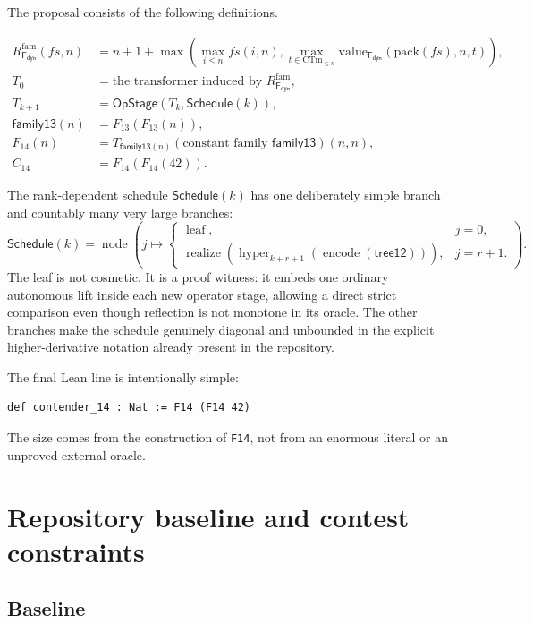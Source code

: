 \documentclass[11pt]{article}
\theoremstyle{definition}
\theoremstyle{remark}
\newcommand{\lean}[1]{\texttt{#1}}
\newcommand{\Fd}{\mathsf{F}_{\mathsf{dyn}}}
\newcommand{\opstage}{\mathsf{OpStage}}
\newcommand{\sched}{\mathsf{Schedule}}
\newcommand{\C}[1]{C_{#1}}
\newcommand{\Rfam}{R_{\Fd}^{\mathrm{fam}}}
\begin{document}
The proposal consists of the following definitions.

\begin{align*}
\Rfam(fs,n)
  &= n+1+\max\!\left(
       \max_{i\le n}fs(i,n),
       \max_{t\in\mathrm{CTm}_{\le n}}
          \mathrm{value}_{\Fd}(\mathrm{pack}(fs),n,t)
     \right),\\
T_0&=\text{the transformer induced by }\Rfam,\\
T_{k+1}&=\opstage(T_k,\sched(k)),\\
\mathsf{family13}(n)&=F_{13}(F_{13}(n)),\\
F_{14}(n)&=T_{\mathsf{family13}(n)}
          (\text{constant family }\mathsf{family13})(n,n),\\
\C{14}&=F_{14}(F_{14}(42)).
\end{align*}

The rank-dependent schedule $\sched(k)$ has one deliberately simple branch and
countably many very large branches:
\[
\sched(k)=\operatorname{node}\!\left(j\mapsto
  \begin{cases}
  \operatorname{leaf},&j=0,\\
  \operatorname{realize}\!\left(
    \operatorname{hyper}_{k+r+1}(\operatorname{encode}(\mathsf{tree12}))
  \right),&j=r+1.
  \end{cases}
\right).
\]
The leaf is not cosmetic.  It is a proof witness: it embeds one ordinary
autonomous lift inside each new operator stage, allowing a direct strict
comparison even though reflection is not monotone in its oracle.  The other
branches make the schedule genuinely diagonal and unbounded in the explicit
higher-derivative notation already present in the repository.

The final Lean line is intentionally simple:

\begin{lstlisting}
def contender_14 : Nat := F14 (F14 42)
\end{lstlisting}

The size comes from the construction of \lean{F14}, not from an enormous
literal or an unproved external oracle.

\section{Repository baseline and contest constraints}

\subsection{Baseline}
\end{document}
